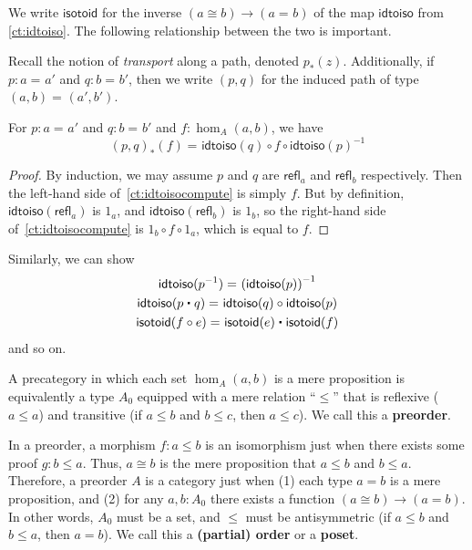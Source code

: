 \documentclass{amsart}
\newcommand{\id}[3][]{\ensuremath{#2 =_{#1} #3}\xspace}
\newcommand{\refl}[1]{\ensuremath{\mathsf{refl}_{#1}}\xspace}
\newcommand{\ct}{\mathrel{\raisebox{.5ex}{$\centerdot$}}}
\newcommand{\opp}[1]{\mathord{{#1}^{-1}}}
\let\rev\opp
\newcommand{\trans}[2]{\ensuremath{{#1}_{*}\!\left({#2}\right)}\xspace}
\theoremstyle{definition}
\theoremstyle{remark}
\numberwithin{equation}{section}
\newcommand{\inv}[1]{{#1}^{-1}}
\newcommand{\idtoiso}{\ensuremath{\mathsf{idtoiso}}\xspace}
\newcommand{\isotoid}{\ensuremath{\mathsf{isotoid}}\xspace}
\begin{document}
We write $\isotoid$ for the inverse $(a\cong b) \to (\id a b)$ of the map $\idtoiso$ from \autoref{ct:idtoiso}.
The following relationship between the two is important.

Recall the notion of \emph{transport} along a path, denoted $\trans p z$.
Additionally, if $p:\id a a'$ and $q:\id b b'$, then we write $(p,q)$ for the induced path of type $\id{(a,b)}{(a',b')}$.

\begin{lem}\label{ct:idtoiso-trans}
  For $p:\id a a'$ and $q:\id b b'$ and $f:\hom_A(a,b)$, we have
  \begin{equation}\label{ct:idtoisocompute}
    \id{\trans{(p,q)}{f}}
    {\idtoiso(q)\circ f \circ \inv{\idtoiso(p)}}
  \end{equation}
\end{lem}
\begin{proof}
  By induction, we may assume $p$ and $q$ are $\refl a$ and $\refl b$ respectively.
Then the left-hand side of~\eqref{ct:idtoisocompute} is simply $f$.
  But by definition, $\idtoiso(\refl a)$ is $1_a$, and $\idtoiso(\refl b)$ is $1_b$, so the right-hand side of~\eqref{ct:idtoisocompute} is $1_b\circ f\circ 1_a$, which is equal to $f$.
\end{proof}

Similarly, we can show
\begin{gather}
  \id{\idtoiso(\rev p)}{\inv {(\idtoiso(p))}}\\
  \id{\idtoiso(p\ct q)}{\idtoiso(q)\circ \idtoiso(p)}\\
  \id{\isotoid(f\circ e)}{\isotoid(e)\ct \isotoid(f)}
\end{gather}
and so on.

\begin{eg}\label{ct:orders}
  A precategory in which each set $\hom_A(a,b)$ is a mere proposition is equivalently a type $A_0$ equipped with a mere relation ``$\le$'' that is reflexive ($a\le a$) and transitive (if $a\le b$ and $b\le c$, then $a\le c$).
  We call this a \textbf{preorder}.

  In a preorder, a morphism $f\colon a\le b$ is an isomorphism just when there exists some proof $g\colon b\le a$.
  Thus, $a\cong b$ is the mere proposition that $a\le b$ and $b\le a$.
  Therefore, a preorder $A$ is a category just when (1) each type $a=b$ is a mere proposition, and (2) for any $a,b:A_0$ there exists a function $(a\cong b) \to (a=b)$.
  In other words, $A_0$ must be a set, and $\le$ must be antisymmetric (if $a\le b$ and $b\le a$, then $a=b$).
  We call this a \textbf{(partial) order} or a \textbf{poset}.
\end{eg}
\end{document}
